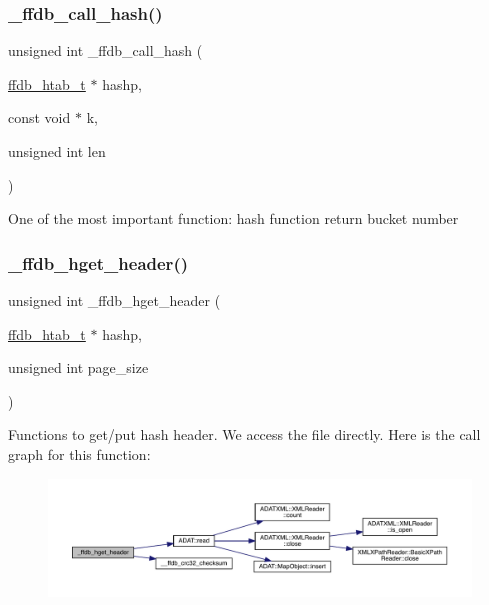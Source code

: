 \subsubsection{\texorpdfstring{\_ffdb\_call\_hash()}{\_ffdb\_call\_hash()}}
{\footnotesize\ttfamily unsigned int \+\_\+ffdb\+\_\+call\+\_\+hash (\begin{DoxyParamCaption}\item[{\mbox{\hyperlink{adat-devel_2other__libs_2filedb_2filehash_2ffdb__hash_8h_ae592010ed2bedc975d3cc0b7d074b9d1}{ffdb\+\_\+htab\+\_\+t}} $\ast$}]{hashp,  }\item[{const void $\ast$}]{k,  }\item[{unsigned int}]{len }\end{DoxyParamCaption})}

One of the most important function\+: hash function return bucket number \mbox{\label{adat-devel_2other__libs_2filedb_2filehash_2ffdb__hash_8c_a62b95f19364737720151b6cdd62015ea}} 
\subsubsection{\texorpdfstring{\_ffdb\_hget\_header()}{\_ffdb\_hget\_header()}}
{\footnotesize\ttfamily unsigned int \+\_\+ffdb\+\_\+hget\+\_\+header (\begin{DoxyParamCaption}\item[{\mbox{\hyperlink{adat-devel_2other__libs_2filedb_2filehash_2ffdb__hash_8h_ae592010ed2bedc975d3cc0b7d074b9d1}{ffdb\+\_\+htab\+\_\+t}} $\ast$}]{hashp,  }\item[{unsigned int}]{page\+\_\+size }\end{DoxyParamCaption})}

Functions to get/put hash header. We access the file directly. Here is the call graph for this function\+:
\nopagebreak
\begin{figure}[H]
\begin{center}
\leavevmode
\includegraphics[width=350pt]{d1/d7a/adat-devel_2other__libs_2filedb_2filehash_2ffdb__hash_8c_a62b95f19364737720151b6cdd62015ea_cgraph}
\end{center}
\end{figure}
\mbox{\label{adat-devel_2other__libs_2filedb_2filehash_2ffdb__hash_8c_a4c5be24458701f3a88770dc202be8a0c}} 
